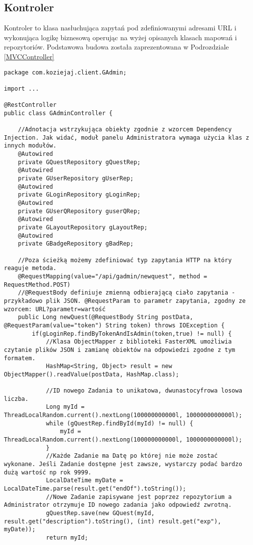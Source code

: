 \documentclass[a4paper,12pt,twoside,openany]{report}
\begin{document}
\subsection{Kontroler}
Kontroler to klasa nasłuchująca  zapytań pod zdefiniowanymi adresami URL i wykonująca logikę biznesową operując na wyżej opisanych klasach mapowań i repozytoriów. Podstawowa budowa została zaprezentowana w Podrozdziale \ref{MVCController}
\begin{lstlisting}
package com.koziejaj.client.GAdmin;

import ...

@RestController
public class GAdminController {

	//Adnotacja wstrzykująca obiekty zgodnie z wzorcem Dependency Injection. Jak widać, moduł panelu Administratora wymaga użycia klas z innych modułów.
    @Autowired
    private GQuestRepository gQuestRep;
    @Autowired
    private GUserRepository gUserRep;
    @Autowired
    private GLoginRepository gLoginRep;
    @Autowired
    private GUserQRepository guserQRep;
    @Autowired
    private GLayoutRepository gLayoutRep;
    @Autowired
    private GBadgeRepository gBadRep;
	
	//Poza ścieżką możemy zdefiniować typ zapytania HTTP na który reaguje metoda.
    @RequestMapping(value="/api/gadmin/newquest", method = RequestMethod.POST)
    //@RequestBody definiuje zmienną odbierającą ciało zapytania - przykładowo plik JSON. @RequestParam to parametr zapytania, zgodny ze wzorcem: URL?parametr=wartość
    public Long newQuest(@RequestBody String postData, @RequestParam(value="token") String token) throws IOException {
        if(gLoginRep.findByTokenAndIsAdmin(token,true) != null) {
	        //Klasa ObjectMapper z biblioteki FasterXML umożliwia czytanie plików JSON i zamianę obiektów na odpowiedzi zgodne z tym formatem.
            HashMap<String, Object> result = new ObjectMapper().readValue(postData, HashMap.class);
            
			//ID nowego Zadania to unikatowa, dwunastocyfrowa losowa liczba.
            Long myId = ThreadLocalRandom.current().nextLong(100000000000l, 1000000000000l);
            while (gQuestRep.findById(myId) != null) {
                myId = ThreadLocalRandom.current().nextLong(100000000000l, 1000000000000l);
            }
            //Każde Zadanie ma Datę po której nie może zostać wykonane. Jeśli Zadanie dostępne jest zawsze, wystarczy podać bardzo dużą wartość np rok 9999.
            LocalDateTime myDate = LocalDateTime.parse(result.get("endOf").toString());
            //Nowe Zadanie zapisywane jest poprzez repozytorium a Administrator otrzymuje ID nowego zadania jako odpowiedź zwrotną.
            gQuestRep.save(new GQuest(myId, result.get("description").toString(), (int) result.get("exp"), myDate));
            return myId;


\end{lstlisting}
\end{document}
